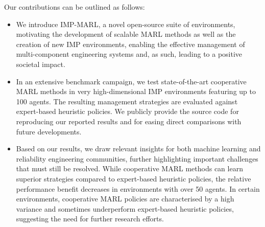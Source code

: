 Our contributions can be outlined as follows:
\begin{itemize}
  \item We introduce IMP-MARL, a novel open-source suite of environments, motivating the development of scalable MARL methods as well as the creation of new IMP environments, enabling the effective management of multi-component engineering systems and, as such, leading to a positive societal impact.
  \item In an extensive benchmark campaign, we test state-of-the-art cooperative MARL methods in very high-dimensional IMP environments featuring up to 100 agents.
  The resulting management strategies are evaluated against expert-based heuristic policies.
  We publicly provide the source code for reproducing our reported results and for easing direct comparisons with future developments.
  \item Based on our results, we draw relevant insights for both machine learning and reliability engineering communities, further highlighting important challenges that must still be resolved.
  While cooperative MARL methods can learn superior strategies compared to expert-based heuristic policies, the relative performance benefit decreases in environments with over 50 agents.
  In certain environments, cooperative MARL policies are characterised by a high variance and sometimes underperform expert-based heuristic policies, suggesting the need for further research efforts.
\end{itemize}




